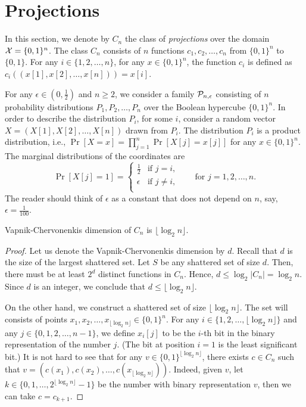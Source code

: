 \section{Projections}
\label{section:projections}

In this section, we denote by $C_n$ the class of \emph{projections} over the
domain $\X = \{0,1\}^n$. The class $C_n$ consists of $n$ functions $c_1, c_2,
\dots, c_n$ from $\{0,1\}^n$ to $\{0,1\}$. For any $i \in \{1,2,\dots,n\}$, for
any $x \in \{0,1\}^n$, the function $c_i$ is defined as $c_i((x[1], x[2], \dots,
x[n])) = x[i]$.

For any $\epsilon \in (0,\frac{1}{2})$ and $n \ge 2$, we consider a family
$\P_{n,\epsilon}$ consisting of $n$ probability distributions $P_1, P_2, \dots,
P_n$ over the Boolean hypercube $\{0,1\}^n$. In order to describe the
distribution $P_i$, for some $i$, consider a random vector $X = (X[1], X[2],
\dots, X[n])$ drawn from $P_i$. The distribution $P_i$ is a product
distribution, i.e., $\Pr[X = x] = \prod_{j=1}^n \Pr[X[j] = x[j]]$ for any $x \in
\{0,1\}^n$. The marginal distributions of the coordinates are
$$
\Pr[X[j] = 1] =
\begin{cases}
\frac{1}{2} & \text{if $j = i$,} \\
\epsilon & \text{if $j\neq i$,} \\
\end{cases}
\qquad \text{for $j=1,2,\dots,n$.}
$$
The reader should think of $\epsilon$ as a constant that does not depend on $n$,
say, $\epsilon=\frac{1}{100}$.

\begin{proposition}
\label{proposition:vc-dimension-projections}
Vapnik-Chervonenkis dimension of $C_n$ is $\lfloor \log_2 n \rfloor$.
\end{proposition}

\begin{proof}
Let us denote the Vapnik-Chervonenkis dimension by $d$. Recall that $d$ is the
size of the largest shattered set. Let $S$ be any shattered set of size $d$.
Then, there must be at least $2^d$ distinct functions in $C_n$. Hence, $d \le
\log_2 |C_n| = \log_2 n$. Since $d$ is an integer, we conclude that $d \le
\lfloor \log_2 n \rfloor$.

On the other hand, we construct a shattered set of size $\lfloor \log_2 n
\rfloor$. The set will consists of points $x_1, x_2, \dots, x_{\lfloor \log_2 n
\rfloor} \in \{0,1\}^n$. For any $i \in \{1,2,\dots,\lfloor \log_2 n \rfloor\}$
and any $j \in \{0,1,2,\dots,n-1\}$, we define $x_i[j]$ to be the $i$-th bit
in the binary representation of the number $j$. (The bit at position $i=1$ is the
least significant bit.) It is not hard to see that for any $v \in
\{0,1\}^{\lfloor \log_2 n \rfloor}$, there exists $c \in C_n$ such that $v =
(c(x_1), c(x_2), \dots, c(x_{\lfloor \log_2 n \rfloor}))$. Indeed, given $v$,
let $k \in \{0,1,\dots,2^{\lfloor \log_2 n \rfloor} - 1\}$ be the number with
binary representation $v$, then we can take $c = c_{k+1}$.
\end{proof}


